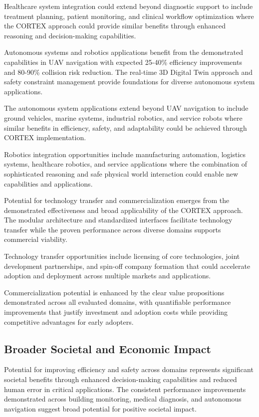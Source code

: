 Healthcare system integration could extend beyond diagnostic support to include treatment planning, patient monitoring, and clinical workflow optimization where the CORTEX approach could provide similar benefits through enhanced reasoning and decision-making capabilities.

Autonomous systems and robotics applications benefit from the demonstrated capabilities in UAV navigation with expected 25-40\% efficiency improvements and 80-90\% collision risk reduction. The real-time 3D Digital Twin approach and safety constraint management provide foundations for diverse autonomous system applications.

The autonomous system applications extend beyond UAV navigation to include ground vehicles, marine systems, industrial robotics, and service robots where similar benefits in efficiency, safety, and adaptability could be achieved through CORTEX implementation.

Robotics integration opportunities include manufacturing automation, logistics systems, healthcare robotics, and service applications where the combination of sophisticated reasoning and safe physical world interaction could enable new capabilities and applications.

Potential for technology transfer and commercialization emerges from the demonstrated effectiveness and broad applicability of the CORTEX approach. The modular architecture and standardized interfaces facilitate technology transfer while the proven performance across diverse domains supports commercial viability.

Technology transfer opportunities include licensing of core technologies, joint development partnerships, and spin-off company formation that could accelerate adoption and deployment across multiple markets and applications.

Commercialization potential is enhanced by the clear value propositions demonstrated across all evaluated domains, with quantifiable performance improvements that justify investment and adoption costs while providing competitive advantages for early adopters.

\subsection{Broader Societal and Economic Impact}

Potential for improving efficiency and safety across domains represents significant societal benefits through enhanced decision-making capabilities and reduced human error in critical applications. The consistent performance improvements demonstrated across building monitoring, medical diagnosis, and autonomous navigation suggest broad potential for positive societal impact.

